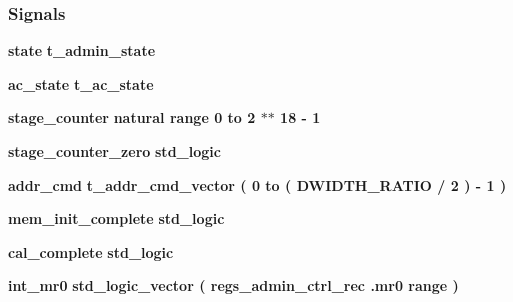 \subsubsection*{Signals}
 \begin{DoxyCompactItemize}
\item 
{\bf state} {\bfseries {\bfseries {\bf t\+\_\+admin\+\_\+state}} \textcolor{vhdlchar}{ }} 
\item 
{\bf ac\+\_\+state} {\bfseries {\bfseries {\bf t\+\_\+ac\+\_\+state}} \textcolor{vhdlchar}{ }} 
\item 
{\bf stage\+\_\+counter} {\bfseries \textcolor{comment}{natural}\textcolor{vhdlchar}{ }\textcolor{vhdlchar}{ }\textcolor{vhdlchar}{ }\textcolor{keywordflow}{range}\textcolor{vhdlchar}{ }\textcolor{vhdlchar}{ } \textcolor{vhdldigit}{0} \textcolor{vhdlchar}{ }\textcolor{keywordflow}{to}\textcolor{vhdlchar}{ }\textcolor{vhdlchar}{ } \textcolor{vhdldigit}{2} \textcolor{vhdlchar}{$\ast$}\textcolor{vhdlchar}{$\ast$}\textcolor{vhdlchar}{ } \textcolor{vhdldigit}{18} \textcolor{vhdlchar}{-\/}\textcolor{vhdlchar}{ } \textcolor{vhdldigit}{1} \textcolor{vhdlchar}{ }} 
\item 
{\bf stage\+\_\+counter\+\_\+zero} {\bfseries \textcolor{comment}{std\+\_\+logic}\textcolor{vhdlchar}{ }} 
\item 
{\bf addr\+\_\+cmd} {\bfseries {\bfseries {\bf t\+\_\+addr\+\_\+cmd\+\_\+vector}} \textcolor{vhdlchar}{ }\textcolor{vhdlchar}{(}\textcolor{vhdlchar}{ }\textcolor{vhdlchar}{ } \textcolor{vhdldigit}{0} \textcolor{vhdlchar}{ }\textcolor{keywordflow}{to}\textcolor{vhdlchar}{ }\textcolor{vhdlchar}{(}\textcolor{vhdlchar}{ }\textcolor{vhdlchar}{ }\textcolor{vhdlchar}{ }\textcolor{vhdlchar}{ }{\bfseries {\bf D\+W\+I\+D\+T\+H\+\_\+\+R\+A\+T\+IO}} \textcolor{vhdlchar}{/}\textcolor{vhdlchar}{ } \textcolor{vhdldigit}{2} \textcolor{vhdlchar}{ }\textcolor{vhdlchar}{)}\textcolor{vhdlchar}{ }\textcolor{vhdlchar}{-\/}\textcolor{vhdlchar}{ } \textcolor{vhdldigit}{1} \textcolor{vhdlchar}{ }\textcolor{vhdlchar}{)}\textcolor{vhdlchar}{ }} 
\item 
{\bf mem\+\_\+init\+\_\+complete} {\bfseries \textcolor{comment}{std\+\_\+logic}\textcolor{vhdlchar}{ }} 
\item 
{\bf cal\+\_\+complete} {\bfseries \textcolor{comment}{std\+\_\+logic}\textcolor{vhdlchar}{ }} 
\item 
{\bf int\+\_\+mr0} {\bfseries \textcolor{comment}{std\+\_\+logic\+\_\+vector}\textcolor{vhdlchar}{ }\textcolor{vhdlchar}{(}\textcolor{vhdlchar}{ }{\bfseries {\bf regs\+\_\+admin\+\_\+ctrl\+\_\+rec}} \textcolor{vhdlchar}{.}{\bfseries {\bf mr0}} \textcolor{vhdlchar}{ }\textcolor{vhdlchar}{\textquotesingle{}}\textcolor{vhdlchar}{ }\textcolor{keywordflow}{range}\textcolor{vhdlchar}{ }\textcolor{vhdlchar}{ }\textcolor{vhdlchar}{)}\textcolor{vhdlchar}{ }} 

\end{DoxyCompactItemize}
